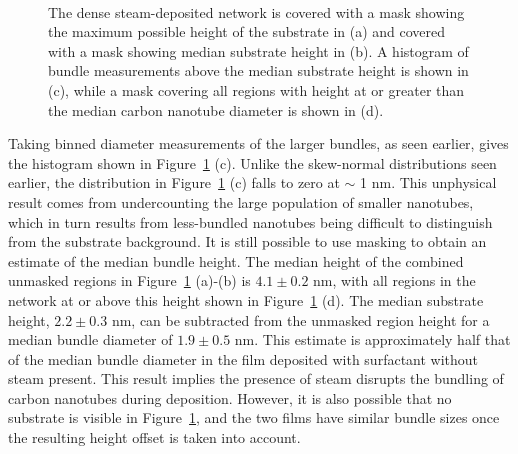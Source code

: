 \documentclass[
  a4paper,
]{scrbook}
\begin{document}
\begin{figure}
\begin{minipage}[t]{0.01\linewidth}
{\centering 

~

}

\end{minipage}%

\caption[An atomic force microscope image of a dense carbon nanotube
network which has been masked below various threshold heights, along
with corresponding histogram height distribution and kernel density
estimate plots.]{\label{fig-dense-network}The dense steam-deposited
network is covered with a mask showing the maximum possible height of
the substrate in (a) and covered with a mask showing median substrate
height in (b). A histogram of bundle measurements above the median
substrate height is shown in (c), while a mask covering all regions with
height at or greater than the median carbon nanotube diameter is shown
in (d).}

\end{figure}

Taking binned diameter measurements of the larger bundles, as seen
earlier, gives the histogram shown in Figure~\ref{fig-dense-network}
(c). Unlike the skew-normal distributions seen earlier, the distribution
in Figure~\ref{fig-dense-network} (c) falls to zero at \(\sim\) 1 nm.
This unphysical result comes from undercounting the large population of
smaller nanotubes, which in turn results from less-bundled nanotubes
being difficult to distinguish from the substrate background. It is
still possible to use masking to obtain an estimate of the median bundle
height. The median height of the combined unmasked regions in
Figure~\ref{fig-dense-network} (a)-(b) is \(4.1 \pm 0.2\) nm, with all
regions in the network at or above this height shown in
Figure~\ref{fig-dense-network} (d). The median substrate height,
\(2.2 \pm 0.3\) nm, can be subtracted from the unmasked region height
for a median bundle diameter of \(1.9 \pm 0.5\) nm. This estimate is
approximately half that of the median bundle diameter in the film
deposited with surfactant without steam present. This result implies the
presence of steam disrupts the bundling of carbon nanotubes during
deposition. However, it is also possible that no substrate is visible in
Figure~\ref{fig-dense-network}, and the two films have similar bundle
sizes once the resulting height offset is taken into account.
\end{document}
